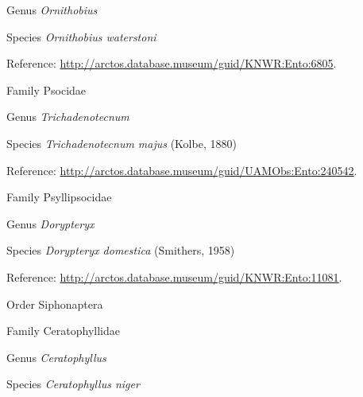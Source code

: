 \documentclass[9pt, article]{memoir}
\begin{document}
\begin{multicols}{2}
\vspace{6pt}\noindent\hspace{30pt}Genus \textit{Ornithobius}


\vspace{6pt}\noindent\hspace{36pt}Species \textit{Ornithobius waterstoni}


\vspace{6pt}Reference: 
\url{http://arctos.database.museum/guid/KNWR:Ento:6805}.

\vspace{6pt}\noindent\hspace{24pt}Family Psocidae


\vspace{6pt}\noindent\hspace{30pt}Genus \textit{Trichadenotecnum}


\vspace{6pt}\noindent\hspace{36pt}Species \textit{Trichadenotecnum majus} (Kolbe, 1880)


\vspace{6pt}Reference: 
\url{http://arctos.database.museum/guid/UAMObs:Ento:240542}.

\vspace{6pt}\noindent\hspace{24pt}Family Psyllipsocidae


\vspace{6pt}\noindent\hspace{30pt}Genus \textit{Dorypteryx}


\vspace{6pt}\noindent\hspace{36pt}Species \textit{Dorypteryx domestica} (Smithers, 1958)


\vspace{6pt}Reference: 
\url{http://arctos.database.museum/guid/KNWR:Ento:11081}.

\vspace{6pt}\noindent\hspace{18pt}Order Siphonaptera


\vspace{6pt}\noindent\hspace{24pt}Family Ceratophyllidae


\vspace{6pt}\noindent\hspace{30pt}Genus \textit{Ceratophyllus}


\vspace{6pt}\noindent\hspace{36pt}Species \textit{Ceratophyllus niger}



\end{multicols}
\end{document}
